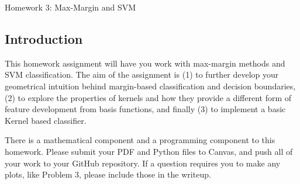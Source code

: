 \documentclass[submit]{harvardml}
\begin{document}
\begin{center}
{\Large Homework 3: Max-Margin and SVM}\\
\end{center}
\subsection*{Introduction}

This homework assignment will have you work with max-margin methods
and SVM classification. The aim of the assignment is (1) to further
develop your geometrical intuition behind margin-based classification
and decision boundaries, (2) to explore the properties of kernels and
how they provide a different form of feature development from
basis functions, and finally (3) to implement a basic Kernel based
classifier.

There is a mathematical component and a programming component to this
homework.  Please submit your PDF and Python files to Canvas, and push
all of your work to your GitHub repository. If a question requires you
to make any plots, like Problem 3, please include those in the
writeup.
\end{document}
